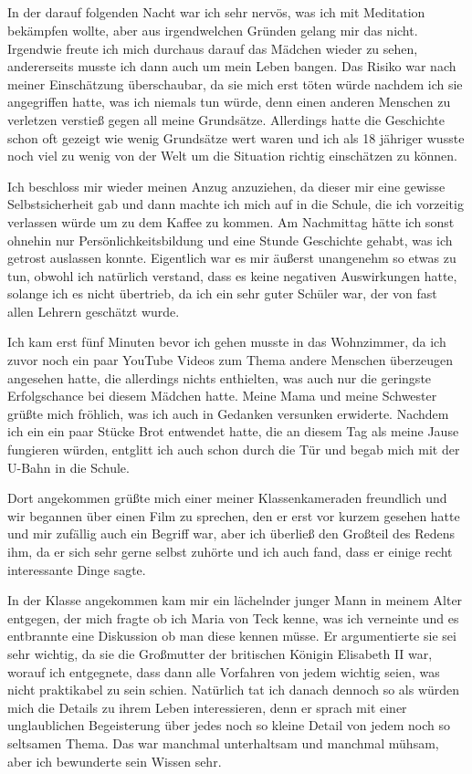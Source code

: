 \documentclass[11pt, a5paper]{article}
\begin{document}
\begin{spacing}{1.2}
		\section{}
		In der darauf folgenden Nacht war ich sehr nervös, was ich mit Meditation bekämpfen wollte, aber aus irgendwelchen Gründen gelang mir das nicht. Irgendwie freute ich mich durchaus darauf das Mädchen wieder zu sehen, andererseits musste ich dann auch um mein Leben bangen. Das Risiko war nach meiner Einschätzung überschaubar, da sie mich erst töten würde nachdem ich sie angegriffen hatte, was ich niemals tun würde, denn einen anderen Menschen zu verletzen verstieß gegen all meine Grundsätze. Allerdings hatte die Geschichte schon oft gezeigt wie wenig Grundsätze wert waren und ich als 18 jähriger wusste noch viel zu wenig von der Welt um die Situation richtig einschätzen zu können.
		
		Ich beschloss mir wieder meinen Anzug anzuziehen, da dieser mir eine gewisse Selbstsicherheit gab und dann machte ich mich auf in die Schule, die ich vorzeitig verlassen würde um zu dem Kaffee zu kommen. Am Nachmittag hätte ich sonst ohnehin nur Persönlichkeitsbildung und eine Stunde Geschichte gehabt, was ich getrost auslassen konnte. Eigentlich war es mir äußerst unangenehm so etwas zu tun, obwohl ich natürlich verstand, dass es keine negativen Auswirkungen hatte, solange ich es nicht übertrieb, da ich ein sehr guter Schüler war, der von fast allen Lehrern geschätzt wurde.
		
		Ich kam erst fünf Minuten bevor ich gehen musste in das Wohnzimmer, da ich zuvor noch ein paar YouTube Videos zum Thema andere Menschen überzeugen angesehen hatte, die allerdings nichts enthielten, was auch nur die geringste Erfolgschance bei diesem Mädchen hatte. Meine Mama und meine Schwester grüßte mich fröhlich, was ich auch in Gedanken versunken erwiderte. Nachdem ich ein ein paar Stücke Brot entwendet hatte, die an diesem Tag als meine Jause fungieren würden, entglitt ich auch schon durch die Tür und begab mich mit der U-Bahn in die Schule.
		
		Dort angekommen grüßte mich einer meiner Klassenkameraden freundlich und wir begannen über einen Film zu sprechen, den er erst vor kurzem gesehen hatte und mir zufällig auch ein Begriff war, aber ich überließ den Großteil des Redens ihm, da er sich sehr gerne selbst zuhörte und ich auch fand, dass er einige recht interessante Dinge sagte.
		
		In der Klasse angekommen kam mir ein lächelnder junger Mann in meinem Alter entgegen, der mich fragte ob ich Maria von Teck kenne, was ich verneinte und es entbrannte eine Diskussion ob man diese kennen müsse. Er argumentierte sie sei sehr wichtig, da sie die Großmutter der britischen Königin Elisabeth II war, worauf ich entgegnete, dass dann alle Vorfahren von jedem wichtig seien, was nicht praktikabel zu sein schien. Natürlich tat ich danach dennoch so als würden mich die Details zu ihrem Leben interessieren, denn er sprach mit einer unglaublichen Begeisterung über jedes noch so kleine Detail von jedem noch so seltsamen Thema. Das war manchmal unterhaltsam und manchmal mühsam, aber ich bewunderte sein Wissen sehr.
		

\end{spacing}
\end{document}
